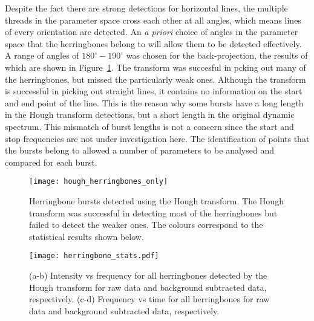 Despite the fact there are strong detections for horizontal lines, the multiple threads in the parameter space cross each other at all angles, which means lines of every orientation are detected. An {\it a priori} choice of angles in the parameter space that the herringbones belong to will allow them to be detected effectively. A range of angles of $180^{\circ}-190^{\circ}$ was chosen for the back-projection, the results of which are shown in Figure~\ref{fig:hough_hb}. The transform was succesful in pcking out many of the herringbones, but missed the particularly weak ones. Although the transform is successful in picking out straight lines, it contains no information on the start and end point of the line. This is the reason why some bursts have a long length in the Hough transform detections, but a short length in the original dynamic spectrum. This mismatch of burst lengths is not a concern since the start and stop frequencies are not under investigation here. The identification of points that the bursts belong to allowed a number of parameters to be analysed and compared for each burst.
%
%
\begin{figure}[t!]
\begin{center}
\texttt{[image: hough\_herringbones\_only]}
\caption[Hough transform herringbones]{Herringbone bursts detected using the Hough transform. The Hough transform was successful in detecting most of the herringbones but failed to detect the weaker ones. The colours correspond to the statistical results shown below.}
\label{fig:hough_hb}
\end{center}
\end{figure}
%
%
\begin{figure}[t!]
\begin{center}
\texttt{[image: herringbone\_stats.pdf]}
\caption[Herringbone statistics 1]{(a-b) Intensity vs frequency for all herringbones detected by the Hough transform for raw data and background subtracted data, respectively. (c-d) Frequency vs time for all herringbones for raw data and background subtracted data, respectively.}
\label{fig:bibf}
\end{center}
\end{figure}


